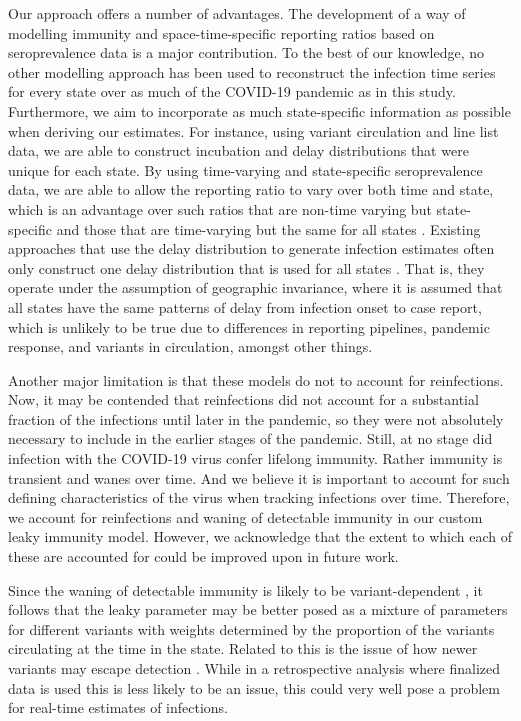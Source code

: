 \documentclass{article}
\begin{document}
Our approach offers a number of advantages. The development 
of a way of modelling immunity and space-time-specific reporting ratios based on 
seroprevalence data is a major contribution. 
To the best of our knowledge, no other modelling approach has been used to 
reconstruct the infection time series
for every state over as much of the COVID-19 pandemic as in this study.
Furthermore, we aim to incorporate as much state-specific information as
possible when deriving our estimates. For instance, using variant circulation
and line list data, we are able to construct incubation and delay distributions
that were unique for each state. By using time-varying and state-specific
seroprevalence data, we are able to allow the reporting ratio to vary over both
time and state, which is an advantage over such ratios that are non-time varying
but state-specific and those that are time-varying but the same for all states
\citep{unwin2020state, uga2020covid19}. 
Existing approaches that use the delay distribution to generate infection
estimates often only construct one delay distribution that is used for all
states \citep{chitwood2021reconstructing, jahja2022real}. That is, they operate
under the assumption of geographic invariance, where it is assumed that all
states have the same patterns of delay from infection onset to case report,
which is unlikely to be true due to differences in reporting pipelines, pandemic
response, and variants in circulation, amongst other things. 

Another major limitation is that these models do not to account for
reinfections. Now, it may be contended that reinfections did not account for a
substantial fraction of the infections until later in the pandemic, so they were
not absolutely necessary to include in the earlier stages of the pandemic.
Still, at no stage did infection with the COVID-19 virus confer lifelong
immunity. Rather immunity is transient and wanes over time. And we believe it is
important to account for such defining characteristics of the virus when
tracking infections over time. Therefore, we account for reinfections and waning
of detectable immunity in our custom leaky immunity model. However, we 
acknowledge that the extent to which each of these are accounted for could be
improved upon in future work. 

Since the waning of detectable immunity is likely to be variant-dependent
\citep{pooley2023durability}, it follows that the leaky parameter may be better
posed as a mixture of parameters for different variants with weights determined
by the proportion of the variants circulating at the time in the state. Related
to this is the issue of how newer variants may escape detection
\citep{nih2022assessing, fda2023sars}. While in a retrospective analysis where
finalized data is used this is less likely to be an issue, this could very well
pose a problem for real-time estimates of infections.
\end{document}

